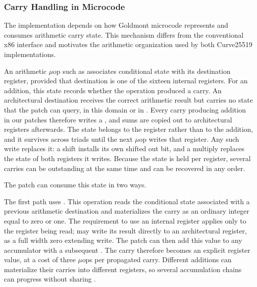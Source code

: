 \subsubsection{Carry Handling in Microcode}
\label{sec:c25519-carries}

The implementation depends on how Goldmont microcode represents and consumes arithmetic carry state.
This mechanism differs from the conventional x86 interface and motivates the arithmetic organization used by both Curve25519 implementations.

An arithmetic $\mu$op such as  associates conditional state with its destination register, provided that destination is one of the sixteen internal  registers.
For an addition, this state records whether the operation produced a carry.
An architectural destination receives the correct arithmetic result but carries no state that the patch can query, in this domain or in .
Every carry producing addition in our patches therefore writes a , and sums are copied out to architectural registers afterwards.
The state belongs to the register rather than to the addition, and it survives across triads until the next $\mu$op writes that register.
Any such write replaces it: a shift installs its own shifted out bit, and a multiply replaces the state of both registers it writes.
Because the state is held per register, several carries can be outstanding at the same time and can be recovered in any order.

The patch can consume this state in two ways.

The first path uses .
This operation reads the conditional state associated with a previous arithmetic destination and materializes the carry as an ordinary integer equal to zero or one.
The requirement to use an internal register applies only to the register being read;  may write its result directly to an architectural register, as a full width zero extending write.
The patch can then add this value to any accumulator with a subsequent .
The carry therefore becomes an explicit register value, at a cost of three $\mu$ops per propagated carry.
Different additions can materialize their carries into different registers, so several accumulation chains can progress without sharing .

